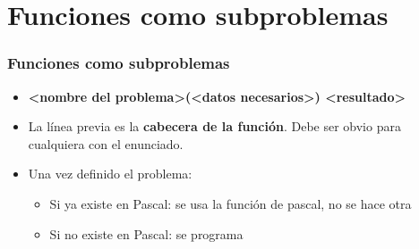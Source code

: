 \section{Funciones como subproblemas}

\begin{frame}
\frametitle{Funciones como subproblemas}

\begin{itemize}
\item \small{\textbf{<nombre del problema>(<datos necesarios>) <resultado>}}
\item La línea previa es la \textbf{cabecera de la función}. Debe ser obvio para cualquiera con el enunciado.
\item Una vez definido el problema:
    \begin{itemize}
    \item Si ya existe en Pascal: se usa la función de pascal, no se hace otra
    \item Si no existe en Pascal: se programa
    \end{itemize}
\end{itemize}

\end{frame}
